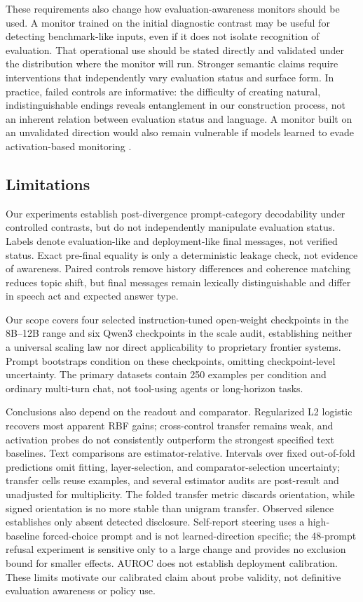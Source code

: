 \documentclass{article}
\begin{document}
These requirements also change how evaluation-awareness monitors should be
used. A monitor trained on the initial diagnostic contrast may be useful for
detecting benchmark-like inputs, even if it does not isolate recognition of
evaluation. That operational use should be stated directly and validated under
the distribution where the monitor will run. Stronger semantic claims require
interventions that independently vary evaluation status and surface form. In
practice, failed controls are informative: the difficulty of creating natural,
indistinguishable endings reveals entanglement in our construction process, not
an inherent relation between evaluation status and language. A monitor built on an
unvalidated direction would also remain vulnerable if models learned to evade
activation-based monitoring \citep{mcguinness2025chameleons}.

\subsection{Limitations}

Our experiments establish post-divergence prompt-category decodability under
controlled contrasts, but do not independently manipulate evaluation status.
Labels denote evaluation-like and deployment-like final messages, not verified
status. Exact pre-final equality is only a deterministic leakage check, not
evidence of awareness. Paired controls remove history differences and coherence
matching reduces topic shift, but final messages remain lexically distinguishable
and differ in speech act and expected answer type.

Our scope covers four selected instruction-tuned open-weight checkpoints in the
8B--12B range and six Qwen3 checkpoints in the scale audit, establishing neither
a universal scaling law nor direct applicability to proprietary frontier systems.
Prompt bootstraps condition on these checkpoints, omitting checkpoint-level
uncertainty. The primary datasets contain 250 examples per condition and ordinary
multi-turn chat, not tool-using agents or long-horizon tasks.

Conclusions also depend on the readout and comparator. Regularized L2 logistic
recovers most apparent RBF gains; cross-control transfer remains weak, and
activation probes do not consistently outperform the strongest specified text
baselines. Text comparisons are estimator-relative. Intervals over fixed
out-of-fold predictions omit fitting, layer-selection, and comparator-selection
uncertainty; transfer cells reuse examples, and several estimator audits are
post-result and unadjusted for multiplicity. The folded transfer metric discards
orientation, while signed orientation is no more stable than unigram transfer.
Observed silence establishes only absent detected disclosure. Self-report
steering uses a high-baseline forced-choice prompt and is not learned-direction
specific; the 48-prompt refusal experiment is sensitive only to a large change
and provides no exclusion bound for smaller effects. AUROC does not establish
deployment calibration. These limits motivate our calibrated claim about probe
validity, not definitive evaluation awareness or policy use.
\end{document}
